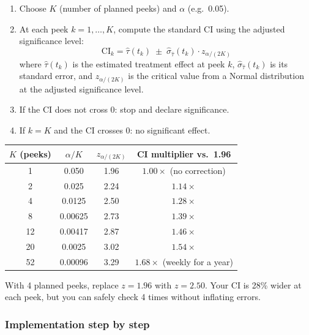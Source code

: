 \documentclass[12pt, a4paper]{article}
\begin{document}
\begin{enumerate}[nosep]
  \item Choose $K$ (number of planned peeks) and $\alpha$ (e.g.\ 0.05).
  \item At each peek $k = 1, \ldots, K$, compute the standard CI using
        the adjusted significance level:
        \[
          \text{CI}_k = \hat{\tau}(t_k) \;\pm\;
          \hat{\sigma}_{\hat{\tau}}(t_k) \cdot z_{\alpha/(2K)}
        \]
        where $\hat{\tau}(t_k)$ is the estimated treatment effect at peek $k$,
        $\hat{\sigma}_{\hat{\tau}}(t_k)$ is its standard error, and
        $z_{\alpha/(2K)}$ is the critical value from a Normal distribution
        at the adjusted significance level.
  \item If the CI does not cross 0: stop and declare significance.
  \item If $k = K$ and the CI crosses 0: no significant effect.
\end{enumerate}

\begin{center}
\renewcommand{\arraystretch}{1.3}
\begin{tabular}{@{} c c c c @{}}
\toprule
$K$ (peeks) & $\alpha/K$ & $z_{\alpha/(2K)}$ & CI multiplier vs.\ 1.96 \\
\midrule
1  & 0.050  & 1.96 & $1.00\times$ (no correction) \\
2  & 0.025  & 2.24 & $1.14\times$ \\
4  & 0.0125 & 2.50 & $1.28\times$ \\
8  & 0.00625 & 2.73 & $1.39\times$ \\
12 & 0.00417 & 2.87 & $1.46\times$ \\
20 & 0.0025  & 3.02 & $1.54\times$ \\
52 & 0.00096 & 3.29 & $1.68\times$ (weekly for a year) \\
\bottomrule
\end{tabular}
\end{center}

\begin{plainlanguage}
With 4 planned peeks, replace $z = 1.96$ with $z = 2.50$.  Your CI is
28\% wider at each peek, but you can safely check 4 times without
inflating errors.
\end{plainlanguage}

\subsubsection*{Implementation step by step}
\end{document}
